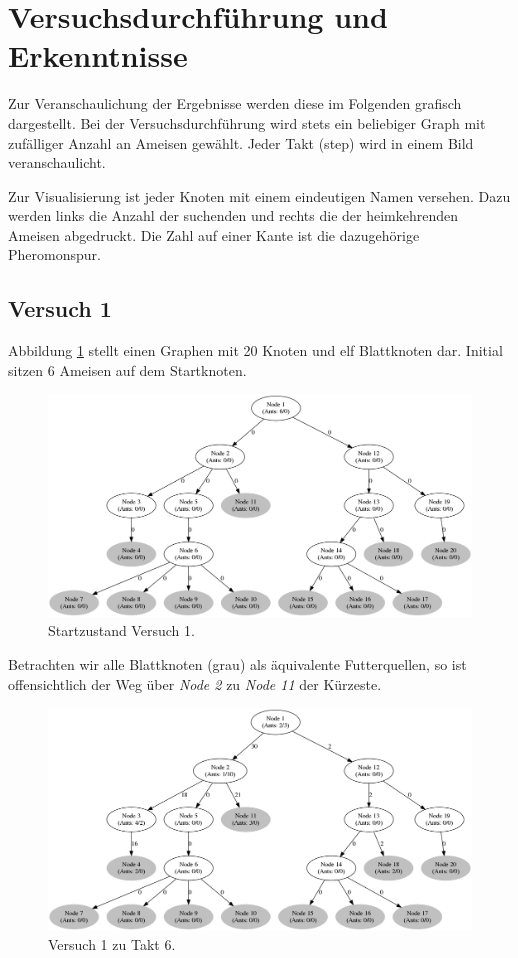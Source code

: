 
\section{Versuchsdurchführung und Erkenntnisse}

Zur Veranschaulichung der Ergebnisse werden diese im Folgenden grafisch dargestellt.
Bei der Versuchsdurchführung wird stets ein beliebiger Graph mit zufälliger Anzahl an Ameisen gewählt. Jeder Takt (step) wird in einem Bild veranschaulicht.\par
Zur Visualisierung ist jeder Knoten mit einem eindeutigen Namen versehen.
Dazu werden links die Anzahl der suchenden und rechts die der heimkehrenden Ameisen abgedruckt.
Die Zahl auf einer Kante ist die dazugehörige Pheromonspur.

\subsection{Versuch 1}
Abbildung \ref{fig:v1} stellt einen Graphen mit 20 Knoten und elf Blattknoten dar. Initial sitzen 6 Ameisen auf dem Startknoten.

\begin{figure}[htbp]
	\includegraphics[width=.9\textwidth]{images/v1_1.png}
	\caption{Startzustand Versuch 1.}
	\label{fig:v1}
\end{figure}

Betrachten wir alle Blattknoten (grau) als äquivalente Futterquellen, so ist offensichtlich der Weg über \emph{Node 2} zu \emph{Node 11} der Kürzeste.

\begin{figure}[htbp]
	\includegraphics[width=.9\textwidth]{images/v1_6.png}
	\caption{Versuch 1 zu Takt 6.}
	\label{fig:v1_6}
\end{figure}

